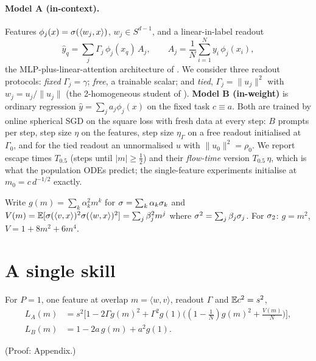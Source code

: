 \paragraph{Model A (in-context).} Features $\phi_j(x)=\sigma(\langle w_j,x\rangle)$, $w_j\in S^{d-1}$, and a linear-in-label readout
\begin{equation}
\hat y_q=\sum_j\Gamma_j\,\phi_j(x_q)\,A_j,\qquad A_j=\frac1N\sum_{i=1}^N y_i\,\phi_j(x_i),
\label{eq:modelA}
\end{equation}
the MLP-plus-linear-attention architecture of \citet{oko2024pretrained}. We consider three readout protocols: \emph{fixed}
$\Gamma_j=\gamma$; \emph{free}, a trainable scalar; and \emph{tied}, $\Gamma_j=\|u_j\|^2$ with $w_j=u_j/\|u_j\|$ (the 2-homogeneous
student of \citet{ren2025emergence}). \textbf{Model B (in-weight)} is ordinary regression $\hat y=\sum_j a_j\phi_j(x)$ on the fixed
task $c\equiv a$. Both are trained by online spherical SGD on the square loss with fresh data at every step: $B$ prompts per step, step size
$\eta$ on the features, step size $\eta_\Gamma$ on a free readout initialised at $\Gamma_0$,
and for the tied readout an unnormalised $u$ with $\|u_0\|^2=\rho_0$. We report escape times $T_{0.5}$ (steps until $|m|\ge\tfrac12$) and
their \emph{flow-time} version $T_{0.5}\,\eta$, which is what the population ODEs predict; the single-feature experiments initialise
at $m_0=c\,d^{-1/2}$ exactly.

Write $g(m)=\sum_k\alpha_k^2m^k$ for $\sigma=\sum_k\alpha_k\sigma_k$ and $V(m)=\mathbb{E}[\sigma(\langle v,x\rangle)^2\sigma(\langle w,x\rangle)^2]=\sum_j\beta_j^2m^j$
where $\sigma^2=\sum_j\beta_j\sigma_j$. For $\sigma_2$: $g=m^2$, $V=1+8m^2+6m^4$.

\section{A single skill}
\label{sec:single}

\begin{proposition}
\label{prop:loss}
For $P=1$, one feature at overlap $m=\langle w,v\rangle$, readout $\Gamma$ and $\mathbb{E} c^2=s^2$,
\begin{equation}
\begin{aligned}
L_A(m)&=s^2\Big[1-2\Gamma g(m)^2+\Gamma^2 g(1)\Big((1-\tfrac1N)g(m)^2+\tfrac{V(m)}{N}\Big)\Big],\\
L_B(m)&=1-2a\,g(m)+a^2g(1).
\end{aligned}
\label{eq:LA}
\end{equation}
\end{proposition}
(Proof: Appendix.)

